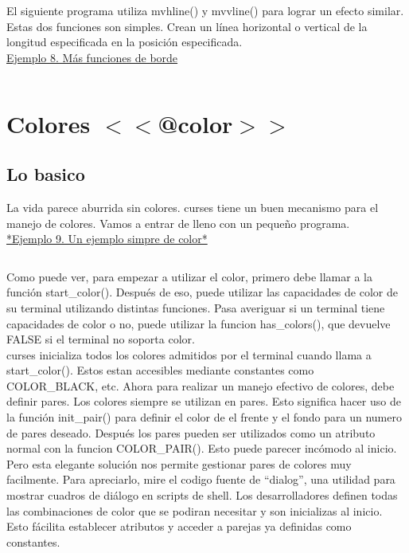 \documentclass{article}
\begin{document}
El siguiente programa utiliza mvhline() y mvvline() para lograr un efecto
similar. Estas dos funciones son simples. Crean un línea horizontal o vertical
de la longitud especificada en la posición especificada.\\

\href{https://github.com/nasciiboy/NCURSES-Programming-HOWTO/blob/master/ncurses_programs/basics/other_border.c}{Ejemplo 8. Más funciones de borde}
\inputminted{cpp}{./cpp/008_borde.cpp}

\section{Colores $<<$@color$>>$}%
\subsection{Lo basico}%
La vida parece aburrida sin colores. curses tiene un buen mecanismo para el
manejo de colores. Vamos a entrar de lleno con un pequeño programa.\\

\href{https://github.com/nasciiboy/NCURSES-Programming-HOWTO/blob/master/ncurses_programs/basics/simple_color.c}{*Ejemplo 9. Un ejemplo simpre de color*}
\inputminted{cpp}{./cpp/009_color.cpp}

Como puede ver, para empezar a utilizar el color, primero debe llamar a la
función start\_color(). Después de eso, puede utilizar las capacidades de color
de su terminal utilizando distintas funciones. Pasa averiguar si un terminal
tiene capacidades de color o no, puede utilizar la funcion has\_colors(), que
devuelve FALSE si el terminal no soporta color.\\

curses inicializa todos los colores admitidos por el terminal cuando llama a
start\_color(). Estos estan accesibles mediante constantes como COLOR\_BLACK,
etc. Ahora para realizar un manejo efectivo de colores, debe definir pares. Los
colores siempre se utilizan en pares. Esto significa hacer uso de la función
init\_pair() para definir el color de el frente y el fondo para un numero de
pares deseado. Después los pares pueden ser utilizados como un atributo normal
con la funcion COLOR\_PAIR(). Esto puede parecer incómodo al inicio. Pero esta
elegante solución nos permite gestionar pares de colores muy facilmente. Para
apreciarlo, mire el codigo fuente de “dialog”, una utilidad para mostrar
cuadros de diálogo en scripts de shell. Los desarrolladores definen todas las
combinaciones de color que se podiran necesitar y son inicializas al inicio.
Esto fácilita establecer atributos y acceder a parejas ya definidas como
constantes.\\
\end{document}
